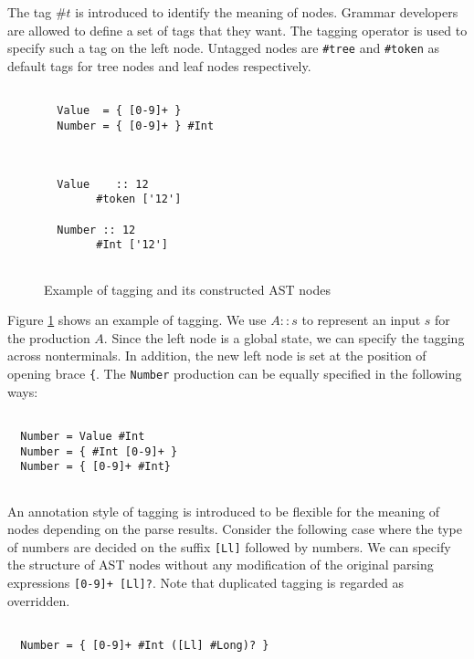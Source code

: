 \documentclass[JIP]{ipsj}
\begin{document}
The tag $\#t$ is introduced to identify the meaning of nodes. Grammar developers are allowed to define a set of tags that they want. The tagging operator is used to specify such a tag on the left node. Untagged nodes are \verb|#tree| and \verb|#token| as default tags for tree nodes and leaf nodes respectively. 

\begin{figure}[tb]
{\small \begin{framed} \begin{verbatim}

  Value  = { [0-9]+ }
  Number = { [0-9]+ } #Int
  
\end{verbatim} \end{framed} }

{\small \begin{verbatim}

  Value    :: 12
        #token ['12']

  Number :: 12
        #Int ['12']
  
\end{verbatim}}
\caption{Example of tagging and its constructed AST nodes}
\label{fig:tagging}
\end{figure}

Figure \ref{fig:tagging} shows an example of tagging. We use $A :: s$ to represent an input $s$ for the production $A$. Since the left node is a global state, we can specify the tagging across nonterminals. In addition, the new left node is set at the position of opening brace \verb|{|. The {\tt Number} production can be equally specified in the following ways:

{\small \begin{verbatim}

  Number = Value #Int
  Number = { #Int [0-9]+ } 
  Number = { [0-9]+ #Int} 
  
\end{verbatim}}

An annotation style of tagging is introduced to be flexible for the meaning of nodes depending on the parse results. Consider the following case where the type of numbers are decided on the suffix \verb|[Ll]| followed by numbers. We can specify the structure of AST nodes  without any modification of the original parsing expressions \verb|[0-9]+ [Ll]?|. Note that duplicated tagging is regarded as overridden. 

{\small \begin{verbatim}

  Number = { [0-9]+ #Int ([Ll] #Long)? } 
  
\end{verbatim}}
\end{document}

